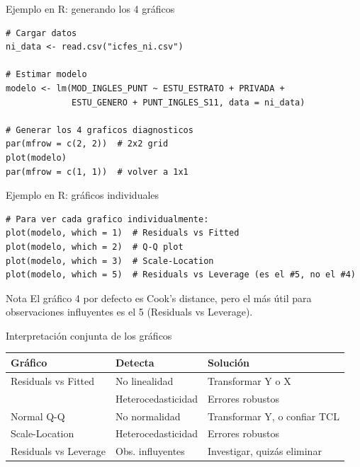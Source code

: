 \documentclass[aspectratio=169, 11pt]{beamer}
\begin{document}
\begin{frame}[fragile]{Ejemplo en R: generando los 4 gráficos}
\begin{lstlisting}
# Cargar datos
ni_data <- read.csv("icfes_ni.csv")

# Estimar modelo
modelo <- lm(MOD_INGLES_PUNT ~ ESTU_ESTRATO + PRIVADA +
             ESTU_GENERO + PUNT_INGLES_S11, data = ni_data)

# Generar los 4 graficos diagnosticos
par(mfrow = c(2, 2))  # 2x2 grid
plot(modelo)
par(mfrow = c(1, 1))  # volver a 1x1
\end{lstlisting}
\end{frame}

\begin{frame}[fragile]{Ejemplo en R: gráficos individuales}
\begin{lstlisting}
# Para ver cada grafico individualmente:
plot(modelo, which = 1)  # Residuals vs Fitted
plot(modelo, which = 2)  # Q-Q plot
plot(modelo, which = 3)  # Scale-Location
plot(modelo, which = 5)  # Residuals vs Leverage (es el #5, no el #4)
\end{lstlisting}

\vspace{0.3cm}
\begin{alertblock}{Nota}
El gráfico 4 por defecto es Cook's distance, pero el más útil para observaciones influyentes es el 5 (Residuals vs Leverage).
\end{alertblock}
\end{frame}

\begin{frame}{Interpretación conjunta de los gráficos}
\begin{center}
\renewcommand{\arraystretch}{1.4}
\begin{tabular}{lll}
\toprule
\textbf{Gráfico} & \textbf{Detecta} & \textbf{Solución} \\
\midrule
Residuals vs Fitted & No linealidad & Transformar Y o X \\
 & Heterocedasticidad & Errores robustos \\
\midrule
Normal Q-Q & No normalidad & Transformar Y, o confiar TCL \\
\midrule
Scale-Location & Heterocedasticidad & Errores robustos \\
\midrule
Residuals vs Leverage & Obs. influyentes & Investigar, quizás eliminar \\
\bottomrule
\end{tabular}
\end{center}
\end{frame}
\end{document}

